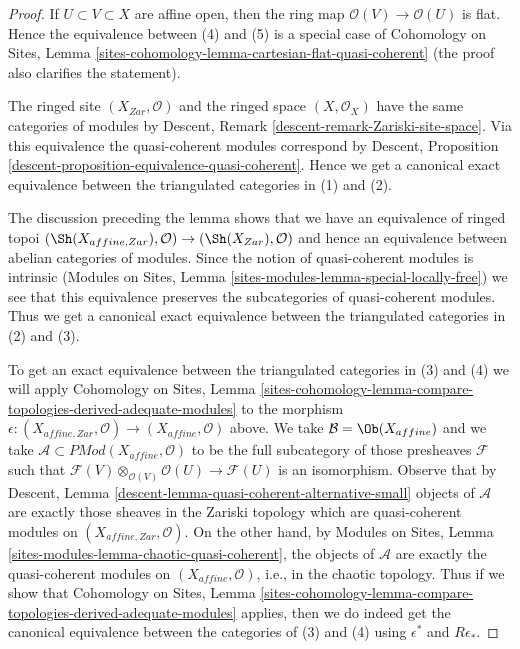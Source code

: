 \begin{proof}
If $U \subset V \subset X$ are affine open, then the ring map
$\mathcal{O}(V) \to \mathcal{O}(U)$ is flat. Hence
the equivalence between (4) and (5) is a special case of
Cohomology on Sites, Lemma
\ref{sites-cohomology-lemma-cartesian-flat-quasi-coherent}
(the proof also clarifies the statement).

\medskip\noindent
The ringed site $(X_{Zar}, \mathcal{O})$ and the ringed space
$(X, \mathcal{O}_X)$ have the same categories of modules by
Descent, Remark \ref{descent-remark-Zariski-site-space}.
Via this equivalence the quasi-coherent modules correspond by
Descent, Proposition \ref{descent-proposition-equivalence-quasi-coherent}.
Hence we get a canonical exact equivalence between the triangulated
categories in (1) and (2).

\medskip\noindent
The discussion preceding the lemma shows that we have an equivalence of
ringed topoi
$(\Sh(X_{affine, Zar}), \mathcal{O}) \to (\Sh(X_{Zar}), \mathcal{O})$
and hence an equivalence between abelian categories of modules.
Since the notion of quasi-coherent modules is intrinsic
(Modules on Sites, Lemma \ref{sites-modules-lemma-special-locally-free})
we see that this equivalence preserves the subcategories
of quasi-coherent modules. Thus  we get a canonical exact equivalence
between the triangulated categories in (2) and (3).

\medskip\noindent
To get an exact equivalence between the triangulated categories
in (3) and (4) we will apply Cohomology on Sites, Lemma
\ref{sites-cohomology-lemma-compare-topologies-derived-adequate-modules}
to the morphism $\epsilon : (X_{affine, Zar}, \mathcal{O}) \to
(X_{affine}, \mathcal{O})$ above. We take
$\mathcal{B} = \Ob(X_{affine})$ and we take
$\mathcal{A} \subset \textit{PMod}(X_{affine}, \mathcal{O})$
to be the full subcategory of those presheaves $\mathcal{F}$
such that $\mathcal{F}(V) \otimes_{\mathcal{O}(V)} \mathcal{O}(U)
\to \mathcal{F}(U)$ is an isomorphism. Observe that by
Descent, Lemma \ref{descent-lemma-quasi-coherent-alternative-small}
objects of $\mathcal{A}$ are exactly those sheaves in the Zariski
topology which are quasi-coherent modules on $(X_{affine, Zar}, \mathcal{O})$.
On the other hand, by Modules on Sites, Lemma
\ref{sites-modules-lemma-chaotic-quasi-coherent},
the objects of $\mathcal{A}$ are exactly the quasi-coherent modules
on $(X_{affine}, \mathcal{O})$, i.e., in the chaotic topology.
Thus if we show that Cohomology on Sites, Lemma
\ref{sites-cohomology-lemma-compare-topologies-derived-adequate-modules}
applies, then we do indeed get the canonical equivalence between the
categories of (3) and (4) using $\epsilon^*$ and $R\epsilon_*$.


\end{proof}
